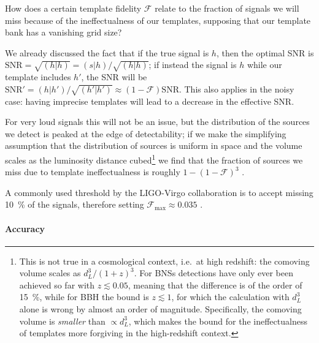 \documentclass[main.tex]{subfiles}
\begin{document}
How does a certain template fidelity \(\mathcal{F}\) relate to the fraction of signals we will miss because of the ineffectualness of our templates, supposing that our template bank has a vanishing grid size? 

We already discussed the fact that if the true signal is \(h\), then the optimal \ac{SNR} is \(\text{SNR} = \sqrt{(h|h)} = (s|h) / \sqrt{(h|h)}\); if instead the signal is \(h\) while our template includes \(h'\), the \ac{SNR} will be \(\text{SNR}' = (h|h') / \sqrt{(h'|h')} \approx (1 - \mathcal{F}) \text{SNR}\). 
This also applies in the noisy case: having imprecise templates will lead to a decrease in the effective \ac{SNR}. 

For very loud signals this will not be an issue, but the distribution of the sources we detect is peaked at the edge of detectability; if we make the simplifying assumption that the distribution of sources is uniform in space and the volume scales as the luminosity distance cubed\footnote{This is not true in a cosmological context, i.e.\ at high redshift: the comoving volume scales as \(d_L^3 / (1+z)^3\). For \acp{BNS} detections have only ever been achieved so far with \(z \lesssim 0.05\), meaning that the difference is of the order of \SI{15}{\%}, while for \ac{BBH} the bound is \(z\lesssim 1\), for which the calculation with \(d_L^3\) alone is wrong by almost an order of magnitude. Specifically, the comoving volume is \emph{smaller} than \(\propto d_L^3\), which makes the bound for the ineffectualness of templates more forgiving in the high-redshift context.} we find that the fraction of sources we miss due to template ineffectualness is roughly \(1 - (1-\mathcal{F})^3\) \cites[eq.\ 18]{damourAccuracyEffectualnessClosedform2011}[eq.\ 2.21]{owenSearchTemplatesGravitational1996}.

A commonly used threshold by the \ac{LIGO}-Virgo collaboration is to accept missing \SI{10}{\percent} of the signals, therefore setting \(\mathcal{F}_{\text{max}} \approx 0.035\) \cite[]{lindblomModelWaveformAccuracy2008}.

\paragraph{Accuracy}
\end{document}
